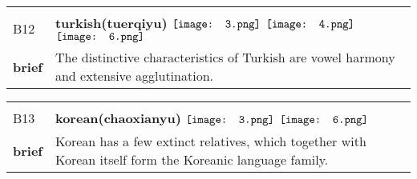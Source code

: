 \documentclass[UTF8]{article}
\begin{document}
            \begin{tabularx}{\textwidth}{p{1.5cm}X}
            \arrayrulecolor{myBlue}
        	\hline\\
            \small{B12}&
            \large{\bfseries{turkish(tuerqiyu)}}\hfill
                                                            \phantom{$\vcenter{\hbox{\texttt{[image: 1.png]}}}$}
                                                                \phantom{$\vcenter{\hbox{\texttt{[image: 2.png]}}}$}
                                                                $\vcenter{\hbox{\texttt{[image: 3.png]}}}$
                                                                $\vcenter{\hbox{\texttt{[image: 4.png]}}}$
                                                                \phantom{$\vcenter{\hbox{\texttt{[image: 5.png]}}}$}
                                                                $\vcenter{\hbox{\texttt{[image: 6.png]}}}$
                                                                \phantom{$\vcenter{\hbox{\texttt{[image: 7.png]}}}$}
                                        \\[10pt]
            \large{\bfseries{brief}}&\noindent\parbox[c]{\hsize}{The distinctive characteristics of Turkish are vowel harmony and extensive agglutination.} \\[5pt]
            \hline\\[-10pt]
        \end{tabularx}
            \begin{tabularx}{\textwidth}{p{1.5cm}X}
            \arrayrulecolor{myBlue}
        	\hline\\
            \small{B13}&
            \large{\bfseries{korean(chaoxianyu)}}\hfill
                                                            \phantom{$\vcenter{\hbox{\texttt{[image: 1.png]}}}$}
                                                                \phantom{$\vcenter{\hbox{\texttt{[image: 2.png]}}}$}
                                                                $\vcenter{\hbox{\texttt{[image: 3.png]}}}$
                                                                \phantom{$\vcenter{\hbox{\texttt{[image: 4.png]}}}$}
                                                                \phantom{$\vcenter{\hbox{\texttt{[image: 5.png]}}}$}
                                                                $\vcenter{\hbox{\texttt{[image: 6.png]}}}$
                                                                \phantom{$\vcenter{\hbox{\texttt{[image: 7.png]}}}$}
                                        \\[10pt]
            \large{\bfseries{brief}}&\noindent\parbox[c]{\hsize}{Korean has a few extinct relatives, which together with Korean itself form the Koreanic language family. } \\[5pt]
            \hline\\[-10pt]
        \end{tabularx}
\end{document}
